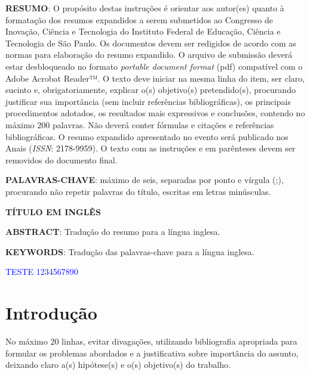 \documentclass[a4paper,11pt]{article} %
\begin{document}






\vspace{0.5cm}
\noindent\textbf{RESUMO}: O propósito destas instruções é orientar aos autor(es) quanto à formatação dos resumos expandidos a serem submetidos ao Congresso de Inovação, Ciência e Tecnologia do Instituto Federal de Educação, Ciência e Tecnologia de São Paulo. Os documentos devem ser redigidos de acordo com as normas para elaboração do resumo expandido. O arquivo de submissão deverá estar desbloqueado no formato \textit{portable document format} (pdf) compatível com o Adobe Acrobat Reader™. O texto deve iniciar na mesma linha do item, ser claro, sucinto e, obrigatoriamente, explicar o(s) objetivo(s) pretendido(s), procurando justificar sua importância (sem incluir referências bibliográficas), os principais procedimentos adotados, os resultados mais expressivos e conclusões, contendo no máximo 200 palavras. Não deverá conter fórmulas e citações e referências bibliográficas. O resumo expandido apresentado no evento será publicado nos Anais (\textit{ISSN}: 2178-9959). O texto com as instruções e em parênteses devem ser removidos do documento final.

\vspace{0.5cm}
\noindent\textbf{PALAVRAS-CHAVE}: máximo de seis, separadas por ponto e vírgula (;), procurando não repetir palavras do título, escritas em letras minúsculas.

\vspace{0.5cm}
 \begin{center}
 \textbf{TÍTULO EM INGLÊS}
 \end{center}

\noindent\textbf{ABSTRACT}: Tradução do resumo para a língua inglesa.

\vspace{0.5cm}
\noindent\textbf{KEYWORDS}: Tradução das palavras-chave para a língua inglesa. 

{\textcolor {blue}{TESTE 1234567890}}


\section*{Introdução}

No máximo 20 linhas, evitar divagações, utilizando bibliografia apropriada para formular os problemas abordados e a justificativa sobre importância do assunto, deixando claro a(s) hipótese(s) e o(s) objetivo(s) do trabalho. 
\end{document}
